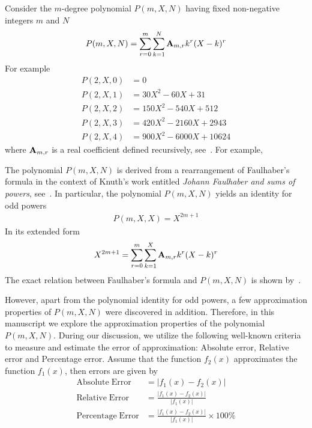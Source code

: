 Consider the $m$-degree polynomial $P(m, X, N)$ having fixed non-negative integers $m$ and $N$
\begin{align*}
    P(m,X,N) = \sum_{r=0}^{m} \sum_{k=1}^{N} {\mathbf{A}} \sb{m,r} k^r (X-k)^r
\end{align*}
For example
\begin{align*}
    P(2,X,0) &= 0 \\
    P(2,X,1) &= 30X^2 - 60X + 31 \\
    P(2,X,2) &= 150X^2 - 540X + 512 \\
    P(2,X,3) &= 420X^2 - 2160X + 2943 \\
    P(2,X,4) &= 900X^2 - 6000X + 10624
\end{align*}
where ${\mathbf{A}} \sb{m,r}$ is a real coefficient defined recursively, see~\cite{alekseyev2018mathoverflow,
    on_the_link_between_binomial_theorem_and_discrete_convolution, unusual_identity_for_odd_powers,
    history_and_overview_of_polynomial_p}.
For example,


The polynomial $P(m, X, N)$ is derived from a rearrangement of Faulhaber's formula
in the context of Knuth's work entitled \textit{Johann Faulhaber and sums of powers}, see~\cite{knuth1993johann}.
In particular, the polynomial $P(m, X, N)$ yields an identity for odd powers
\begin{align*}
    P(m, X, X) = X^{2m+1}
\end{align*}
In its extended form
\begin{align*}
    X^{2m+1} = \sum_{r=0}^{m} \sum_{k=1}^{X} {\mathbf{A}} \sb{m,r} k^r (X-k)^r
\end{align*}
The exact relation between Faulhaber's formula and $P(m,X,N)$ is shown by~\cite{kolosov2025unexpected}.

However, apart from the polynomial identity for odd powers, a few approximation properties of $P(m,X,N)$
were discovered in addition.
Therefore, in this manuscript we explore the approximation properties of the polynomial $P(m,X,N)$.
During our discussion, we utilize the following well-known criteria to measure and estimate
the error of approximation: Absolute error, Relative error and Percentage error.
Assume that the function $f_2(x)$ approximates the function $f_1 (x)$, then errors are given by
\begin{align*}
    \mathrm{Absolute \; Error}   &= \lvert f_1(x) - f_2(x) \rvert \\
    \mathrm{Relative \; Error}   &= \frac{\lvert f_1(x) - f_2(x) \rvert}{\lvert f_1(x) \rvert} \\
    \mathrm{Percentage \; Error} &= \frac{\lvert f_1(x) - f_2(x) \rvert}{\lvert f_1(x) \rvert} \times 100\%
\end{align*}

